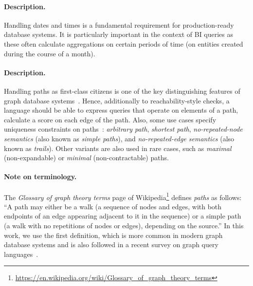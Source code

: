 



\paragraph{Description.}

Handling dates and times is a fundamental requirement for production-ready
database systems. It is particularly important in the context of BI queries as
these often calculate aggregations on certain periods of time (\eg on entities created during the course of a month).





\paragraph{Description.}

Handling paths as first-class citizens is one of the key distinguishing features of graph database 
systems~\cite{DBLP:conf/sigmod/AnglesABBFGLPPS18}. Hence, additionally to
reachability-style checks, a language should be able to express
queries that operate on elements of a path, \eg calculate a score on each edge
of the path.
Also, some use cases specify uniqueness constraints on paths~\cite{DBLP:journals/csur/AnglesABHRV17}:
\emph{arbitrary path},
\emph{shortest path},
\emph{no-repeated-node semantics} (also known as \emph{simple paths}), and
\emph{no-repeated-edge semantics} (also known as \emph{trails}).
Other variants are also used in rare cases, such as \emph{maximal} (non-expandable) or \emph{minimal} (non-contractable) paths.

\paragraph{Note on terminology.}

The \emph{Glossary of graph theory terms} page of Wikipedia\footnote{\url{https://en.wikipedia.org/wiki/Glossary_of_graph_theory_terms}} defines \emph{paths} as follows: ``A path may either be a walk (a sequence of nodes and edges, with both endpoints of an edge appearing adjacent to it in the sequence) or a simple path (a walk with no repetitions of nodes or edges), depending on the source.''
In this work, we use the first definition, which is more common in modern graph database systems and is also followed in a recent survey on graph query languages~\cite{DBLP:journals/csur/AnglesABHRV17}.

